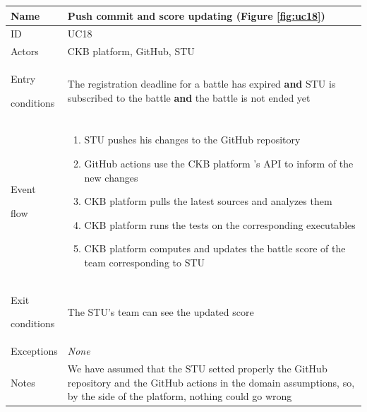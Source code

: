 \begin{center}
    \def\arraystretch{1.5}
    \begin{tabular}{| m{2cm} | m{10cm}|}
        \hline
        Name                  & Push commit and score updating (Figure \ref{fig:uc18})                                                                                                                                              \\ \hline
        ID                    & UC18                                                                                                                                                                         \\ \hline
        Actors                & CKB platform, GitHub, STU                                                                                                                                                    \\ \hline
        Entry \par conditions & The registration deadline for a battle has expired \textbf{and} STU is subscribed to the battle \textbf{and} the battle is not ended yet                                     \\ \hline
        Event \par flow       & \begin{enumerate}
                                    \item STU pushes his changes to the GitHub repository
                                    \item GitHub actions use the CKB platform 's API to inform of the new changes
                                    \item CKB platform pulls the latest sources and analyzes them
                                    \item CKB platform runs the tests on the corresponding executables
                                    \item CKB platform computes and updates the battle score of the team corresponding to STU
                                \end{enumerate}                                                                                     \\ \hline
        Exit \par conditions  & The STU's team can see the updated score                                                                                                                                     \\ \hline
        Exceptions            & \textit{None}                                                                                                                                                                \\ \hline
        Notes                 & We have assumed that the STU setted properly the GitHub repository and the GitHub actions in the domain assumptions, so, by the side of the platform, nothing could go wrong \\ \hline
    \end{tabular}
\end{center}


